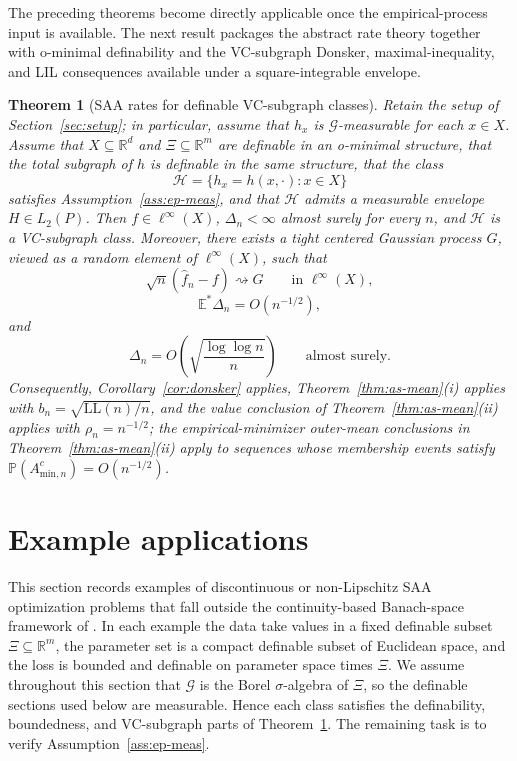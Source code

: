 \documentclass[11pt]{article}
\newtheorem{theorem}{Theorem}[section]
\begin{document}
The preceding theorems become directly applicable once the empirical-process
input is available. The next result packages the abstract rate theory
together with o-minimal definability and the VC-subgraph Donsker,
maximal-inequality, and LIL consequences available under a square-integrable
envelope.

\begin{theorem}[SAA rates for definable VC-subgraph classes]\label{thm:tame-main}
Retain the setup of Section~\ref{sec:setup}; in particular, assume
that $h_{x}$ is $\mathcal{G}$-measurable for each $x\in X$. Assume that
$X\subseteq\mathbb{R}^{d}$ and $\Xi\subseteq\mathbb{R}^{m}$ are
definable in an o-minimal structure, that the total subgraph of $h$
is definable in the same structure, that the class 
\[
\mathcal{H}=\{h_{x}=h(x,\cdot):x\in X\}
\]
satisfies Assumption~\ref{ass:ep-meas},
and that $\mathcal{H}$ admits a measurable envelope $H\in L_{2}(P)$.
Then $f\in\ell^{\infty}(X)$, $\Delta_{n}<\infty$ almost surely for
every $n$, and $\mathcal{H}$ is a VC-subgraph class. Moreover, there
exists a tight centered Gaussian process $G$, viewed
as a random element of $\ell^{\infty}(X)$, such that 
\[
\sqrt{n}(\hat{f}_{n}-f)\rightsquigarrow G\qquad\text{in }\ell^{\infty}(X),
\]
\begin{equation}
\mathbb{E}^{*}\Delta_{n}=O(n^{-1/2}),\label{eq:tame-mean}
\end{equation}
and 
\begin{equation}
\Delta_{n}=O\!\left(\sqrt{\frac{\log\log n}{n}}\right)\qquad\text{almost surely.}\label{eq:tame-blil}
\end{equation}
Consequently, Corollary~\ref{cor:donsker} applies, Theorem~\ref{thm:as-mean}(i)
applies with $b_{n}=\sqrt{\mathrm{LL}(n)/n}$, and the value conclusion of
Theorem~\ref{thm:as-mean}(ii) applies with $\rho_{n}=n^{-1/2}$; the
empirical-minimizer outer-mean conclusions in Theorem~\ref{thm:as-mean}(ii)
apply to sequences whose membership events satisfy
$\mathbb{P}(A_{\mathrm{min},n}^{c})=O(n^{-1/2})$. \end{theorem}

\section{Example applications}

\label{sec:applications}

This section records examples of discontinuous or
non-Lipschitz SAA optimization problems that fall outside the continuity-based
Banach-space framework of \citet{Banholzer2022}. In each example
the data take values in a fixed definable subset $\Xi\subseteq\mathbb{R}^{m}$,
the parameter set is a compact definable subset of Euclidean space,
and the loss is bounded and definable on parameter space times $\Xi$.
We assume throughout this section that $\mathcal{G}$ is the
Borel $\sigma$-algebra of $\Xi$, so the definable sections used below are
measurable. Hence each class satisfies the definability, boundedness,
and VC-subgraph parts of Theorem~\ref{thm:tame-main}. The remaining
task is to verify Assumption~\ref{ass:ep-meas}.
\end{document}
